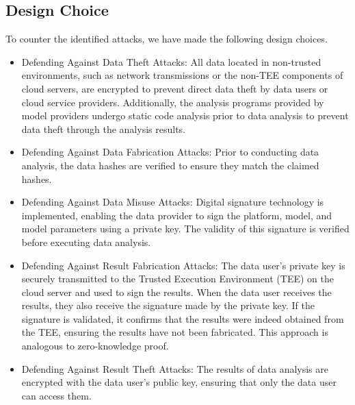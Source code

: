 \subsection{Design Choice}\label{subsec:designchoice}
To counter the identified attacks, we have made the following design choices.
\begin{itemize}
    \item Defending Against Data Theft Attacks: All data located in non-trusted environments, such as network transmissions or the non-TEE components of cloud servers, are encrypted to prevent direct data theft by data users or cloud service providers. Additionally, the analysis programs provided by model providers undergo static code analysis prior to data analysis to prevent data theft through the analysis results.
    \item Defending Against Data Fabrication Attacks: Prior to conducting data analysis, the data hashes are verified to ensure they match the claimed hashes.
    \item Defending Against Data Misuse Attacks: Digital signature technology is implemented, enabling the data provider to sign the platform, model, and model parameters using a private key. The validity of this signature is verified before executing data analysis.
    \item Defending Against Result Fabrication Attacks: The data user's private key is securely transmitted to the Trusted Execution Environment (TEE) on the cloud server and used to sign the results. When the data user receives the results, they also receive the signature made by the private key. If the signature is validated, it confirms that the results were indeed obtained from the TEE, ensuring the results have not been fabricated. This approach is analogous to zero-knowledge proof.
    \item Defending Against Result Theft Attacks: The results of data analysis are encrypted with the data user's public key, ensuring that only the data user can access them.
\end{itemize}